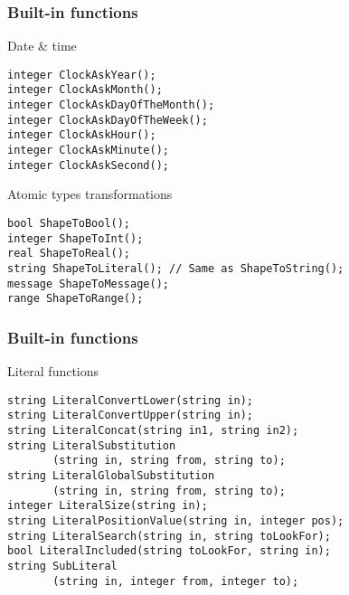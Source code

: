 \documentclass[11pt]{beamer}
\begin{document}
\begin{frame}[fragile]
\frametitle{Built-in functions}
\begin{block}{Date \& time}
\scriptsize
\begin{lstlisting}[language=lekta]
integer ClockAskYear();
integer ClockAskMonth();
integer ClockAskDayOfTheMonth();
integer ClockAskDayOfTheWeek();
integer ClockAskHour();
integer ClockAskMinute();
integer ClockAskSecond();
\end{lstlisting}
\end{block}
\pause
{}
\begin{block}{Atomic types transformations}
\scriptsize
\begin{lstlisting}[language=lekta]
bool ShapeToBool();
integer ShapeToInt();
real ShapeToReal();
string ShapeToLiteral(); // Same as ShapeToString();
message ShapeToMessage();
range ShapeToRange();
\end{lstlisting}
\end{block}
\end{frame}

\begin{frame}[fragile]
\frametitle{Built-in functions}
\begin{block}{Literal functions}
\footnotesize
\begin{lstlisting}[language=lekta]
string LiteralConvertLower(string in);
string LiteralConvertUpper(string in);
string LiteralConcat(string in1, string in2);
string LiteralSubstitution
       (string in, string from, string to);
string LiteralGlobalSubstitution
       (string in, string from, string to);
integer LiteralSize(string in);
string LiteralPositionValue(string in, integer pos);
string LiteralSearch(string in, string toLookFor);
bool LiteralIncluded(string toLookFor, string in);
string SubLiteral
       (string in, integer from, integer to);
\end{lstlisting}
\end{block}
\end{frame}
\end{document}
